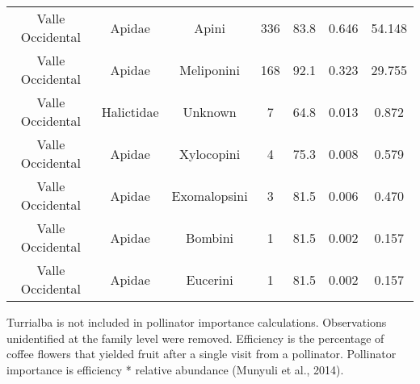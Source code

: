 \begin{table}[!h]
\begin{threeparttable}
\begin{tabular}[t]{ccccccc}
Valle Occidental & Apidae & Apini & 336 & 83.8 & 0.646 & 54.148\\
Valle Occidental & Apidae & Meliponini & 168 & 92.1 & 0.323 & 29.755\\
Valle Occidental & Halictidae & Unknown & 7 & 64.8 & 0.013 & 0.872\\
Valle Occidental & Apidae & Xylocopini & 4 & 75.3 & 0.008 & 0.579\\
Valle Occidental & Apidae & Exomalopsini & 3 & 81.5 & 0.006 & 0.470\\
Valle Occidental & Apidae & Bombini & 1 & 81.5 & 0.002 & 0.157\\
Valle Occidental & Apidae & Eucerini & 1 & 81.5 & 0.002 & 0.157\\
\hline\hline
\end{tabular}
\begin{tablenotes}[para]
\item Turrialba is not included in pollinator importance calculations. Observations unidentified at the family level were removed. Efficiency is the percentage of coffee flowers that yielded fruit after a single visit from a pollinator. Pollinator importance is efficiency * relative abundance (Munyuli et al., 2014).
\end{tablenotes}
\end{threeparttable}
\end{table}
